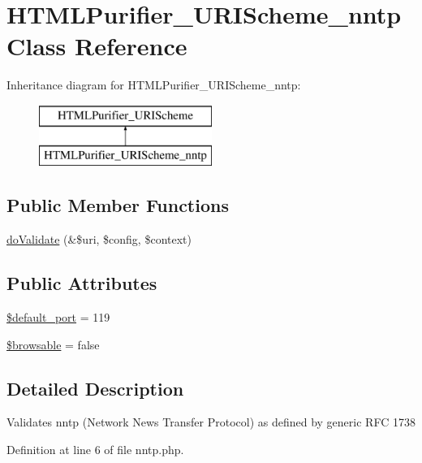 \hypertarget{classHTMLPurifier__URIScheme__nntp}{\section{H\+T\+M\+L\+Purifier\+\_\+\+U\+R\+I\+Scheme\+\_\+nntp Class Reference}
\label{classHTMLPurifier__URIScheme__nntp}
}
Inheritance diagram for H\+T\+M\+L\+Purifier\+\_\+\+U\+R\+I\+Scheme\+\_\+nntp\+:\begin{figure}[H]
\begin{center}
\leavevmode
\includegraphics[height=2.000000cm]{classHTMLPurifier__URIScheme__nntp}
\end{center}
\end{figure}
\subsection*{Public Member Functions}
\begin{DoxyCompactItemize}
\item 
\hyperlink{classHTMLPurifier__URIScheme__nntp_a188471186c7008c41f74587268471180}{do\+Validate} (\&\$uri, \$config, \$context)
\end{DoxyCompactItemize}
\subsection*{Public Attributes}
\begin{DoxyCompactItemize}
\item 
\hyperlink{classHTMLPurifier__URIScheme__nntp_a48da8ce8150b716514fe739a7342cf9b}{\$default\+\_\+port} = 119
\item 
\hyperlink{classHTMLPurifier__URIScheme__nntp_a34a72c83f25d35dcc65f71ad14e08d2a}{\$browsable} = false
\end{DoxyCompactItemize}


\subsection{Detailed Description}
Validates nntp (Network News Transfer Protocol) as defined by generic R\+F\+C 1738 

Definition at line 6 of file nntp.\+php.



